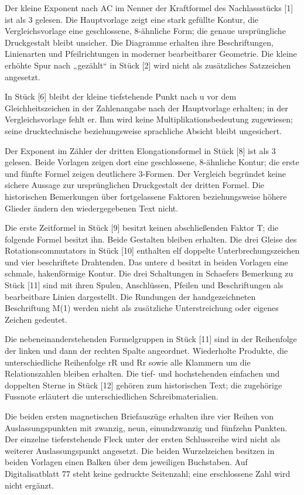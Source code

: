 Der kleine Exponent nach AC im Nenner der Kraftformel des Nachlassstücks [1] ist als 3 gelesen. Die Hauptvorlage zeigt eine stark gefüllte Kontur, die Vergleichsvorlage eine geschlossene, 8-ähnliche Form; die genaue ursprüngliche Druckgestalt bleibt unsicher. Die Diagramme erhalten ihre Beschriftungen, Linienarten und Pfeilrichtungen in moderner bearbeitbarer Geometrie. Die kleine erhöhte Spur nach „gezählt“ in Stück [2] wird nicht als zusätzliches Satzzeichen angesetzt.

In Stück [6] bleibt der kleine tiefstehende Punkt nach u vor dem Gleichheitszeichen in der Zahlenangabe nach der Hauptvorlage erhalten; in der Vergleichsvorlage fehlt er. Ihm wird keine Multiplikationsbedeutung zugewiesen; seine drucktechnische beziehungsweise sprachliche Absicht bleibt ungesichert.

Der Exponent im Zähler der dritten Elongationsformel in Stück [8] ist als 3 gelesen. Beide Vorlagen zeigen dort eine geschlossene, 8-ähnliche Kontur; die erste und fünfte Formel zeigen deutlichere 3-Formen. Der Vergleich begründet keine sichere Aussage zur ursprünglichen Druckgestalt der dritten Formel. Die historischen Bemerkungen über fortgelassene Faktoren beziehungsweise höhere Glieder ändern den wiedergegebenen Text nicht.

Die erste Zeitformel in Stück [9] besitzt keinen abschließenden Faktor T; die folgende Formel besitzt ihn. Beide Gestalten bleiben erhalten. Die drei Gleise des Rotationscommutators in Stück [10] enthalten elf doppelte Unterbrechungszeichen und vier beschriftete Drahtenden. Das untere d besitzt in beiden Vorlagen eine schmale, hakenförmige Kontur. Die drei Schaltungen in Schaefers Bemerkung zu Stück [11] sind mit ihren Spulen, Anschlüssen, Pfeilen und Beschriftungen als bearbeitbare Linien dargestellt. Die Rundungen der handgezeichneten Beschriftung M(1) werden nicht als zusätzliche Unterstreichung oder eigenes Zeichen gedeutet.

Die nebeneinanderstehenden Formelgruppen in Stück [11] sind in der Reihenfolge der linken und dann der rechten Spalte angeordnet. Wiederholte Produkte, die unterschiedliche Reihenfolge rR und Rr sowie alle Klammern um die Relationszahlen bleiben erhalten. Die tief- und hochstehenden einfachen und doppelten Sterne in Stück [12] gehören zum historischen Text; die zugehörige Fussnote erläutert die unterschiedlichen Schreibmaterialien.

Die beiden ersten magnetischen Briefauszüge erhalten ihre vier Reihen von Auslassungspunkten mit zwanzig, neun, einundzwanzig und fünfzehn Punkten. Der einzelne tieferstehende Fleck unter der ersten Schlussreihe wird nicht als weiterer Auslassungspunkt angesetzt. Die beiden Wurzelzeichen besitzen in beiden Vorlagen einen Balken über dem jeweiligen Buchstaben. Auf Digitalisatblatt 77 steht keine gedruckte Seitenzahl; eine erschlossene Zahl wird nicht ergänzt.

